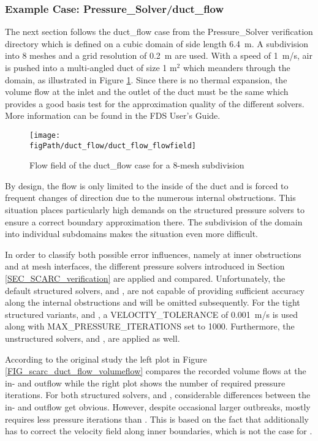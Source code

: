 \subsubsection{Example Case: Pressure\_Solver/duct\_flow}
\label{SEC_SCARC_duct_flow}

The next section follows the {\ct duct\_flow} case from the Pressure\_Solver verification directory which is defined on a cubic domain of side length 6.4~m. A subdivision into 8 meshes and a grid resolution of 0.2~m are used. 
With a speed of 1~m/s, air is pushed into a multi-angled duct of size 1 m$^2$ which meanders through the domain, as
illustrated in Figure \ref{FIG_scarc_duct_flow_flowfield}. 
Since there is no thermal expansion, the volume flow at the inlet and the outlet of the duct must be the same which provides a good basis test for the approximation quality of the different solvers. More information can be found in the FDS User's Guide\cite{McGrattan:2018:UG}.


\begin{figure}[ht]
\centering\texttt{[image: \\figPath/duct\_flow/duct\_flow\_flowfield]}
\caption{Flow field of the {\ct duct\_flow} case for a 8-mesh subdivision}
\label{FIG_scarc_duct_flow_flowfield}
\end{figure}

By design, the flow is only limited to the inside of the duct and is forced to frequent changes of direction due to the numerous internal obstructions. This situation places particularly high demands on the structured pressure solvers to ensure a correct boundary approximation there. The subdivision of the domain into individual subdomains makes the situation even more difficult.

In order to classify both possible error influences, namely at inner obstructions and at mesh interfaces, the different pressure solvers introduced in Section \ref{SEC_SCARC_verification} are applied and compared. Unfortunately, the default structured solvers, \fftdefault{} and \scarcdefault{}, are not capable of providing sufficient accuracy along the internal obstructions and will be omitted subsequently. For the tight structured variants, \ffttight{} and \scarctight{}, a {\ct VELOCITY\_TOLERANCE} of 0.001~m/s is used along with {\ct MAX\_PRESSURE\_ITERATIONS} set to 1000. Furthermore, the unstructured solvers, \uglmat{} and \uscarc{},  are applied as well.
 
According to the original study the left plot in Figure \ref{FIG_scarc_duct_flow_volumeflow} compares the recorded volume flows at the in- and outflow while the right plot shows the number of required pressure iterations.
For both structured solvers, \ffttight{} and \scarctight{}, considerable differences between the in- and outflow get obvious. However, despite occasional larger outbreaks, \scarctight{} mostly requires less pressure iterations than \ffttight{}. This is based on the fact that \ffttight{} additionally has to correct the velocity field along inner boundaries, which is not the case for \scarctight{}. 

